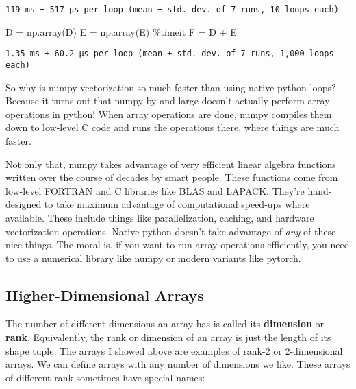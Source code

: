 \documentclass[
  letterpaper,
  DIV=11,
  numbers=noendperiod]{scrreprt}
\newenvironment{Shaded}{\begin{snugshade}}{\end{snugshade}}
\newcommand{\NormalTok}[1]{\textcolor[rgb]{0.00,0.23,0.31}{#1}}
\newcommand{\OperatorTok}[1]{\textcolor[rgb]{0.37,0.37,0.37}{#1}}
\begin{document}
\begin{verbatim}
119 ms ± 517 µs per loop (mean ± std. dev. of 7 runs, 10 loops each)
\end{verbatim}

\begin{Shaded}
\begin{Highlighting}[]
\NormalTok{D }\OperatorTok{=}\NormalTok{ np.array(D)}
\NormalTok{E }\OperatorTok{=}\NormalTok{ np.array(E)}
\OperatorTok{\%}\NormalTok{timeit F }\OperatorTok{=}\NormalTok{ D }\OperatorTok{+}\NormalTok{ E}
\end{Highlighting}
\end{Shaded}

\begin{verbatim}
1.35 ms ± 60.2 µs per loop (mean ± std. dev. of 7 runs, 1,000 loops each)
\end{verbatim}

So why is numpy vectorization so much faster than using native python
loops? Because it turns out that numpy by and large doesn't actually
perform array operations in python! When array operations are done,
numpy compiles them down to low-level C code and runs the operations
there, where things are much faster.

Not only that, numpy takes advantage of very efficient linear algebra
functions written over the course of decades by smart people. These
functions come from low-level FORTRAN and C libraries like
\href{https://netlib.org/blas/}{BLAS} and
\href{https://netlib.org/lapack/}{LAPACK}. They're hand-designed to take
maximum advantage of computational speed-ups where available. These
include things like parallelization, caching, and hardware vectorization
operations. Native python doesn't take advantage of \emph{any} of these
nice things. The moral is, if you want to run array operations
efficiently, you need to use a numerical library like numpy or modern
variants like pytorch.

\hypertarget{higher-dimensional-arrays}{%
\subsection{Higher-Dimensional Arrays}\label{higher-dimensional-arrays}}

The number of different dimensions an array has is called its
\textbf{dimension} or \textbf{rank}. Equivalently, the rank or dimension
of an array is just the length of its shape tuple. The arrays I showed
above are examples of rank-2 or 2-dimensional arrays. We can define
arrays with any number of dimensions we like. These arrays of different
rank sometimes have special names:
\end{document}
